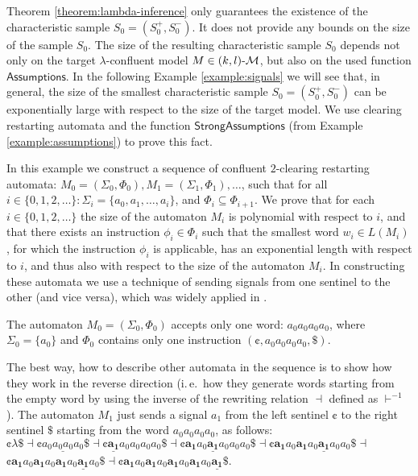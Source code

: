 Theorem \ref{theorem:lambda-inference} only guarantees the existence of the characteristic sample $S_0 = (S_0^+, S_0^-)$. It does not provide any bounds on the size of the sample $S_0$. The size of the resulting characteristic sample $S_0$ depends not only on the target $\lambda$-confluent model $M \in \textup{\sf $(k,l)$-\textup{\sf $\mathcal{M}$}}$, but also on the used function $\mathsf{Assumptions}$. In the following Example \ref{example:signals} we will see that, in general, the size of the smallest characteristic sample $S_0 = (S_0^+, S_0^-)$ can be exponentially large with respect to the size of the target model. We use clearing restarting automata and the function $\mathsf{StrongAssumptions}$ (from Example \ref{example:assumptions}) to prove this fact.

\begin{example}\label{example:signals}
In this example we construct a sequence of confluent $2$-clearing restarting automata: $M_0 = (\Sigma_0, \Phi_0), M_1 = (\Sigma_1, \Phi_1), \ldots$, such that for all $i \in \{0, 1, 2, \ldots\}: \Sigma_i = \{a_0, a_1, \ldots, a_i\}$, and $\Phi_i \subseteq \Phi_{i+1}$. We prove that for each $i \in \{0, 1, 2, \ldots\}$ the size of the automaton $M_i$ is polynomial with respect to $i$, and that there exists an instruction $\phi_i \in \Phi_i$ such that the smallest word $w_i \in L(M_i)$, for which the instruction $\phi_i$ is applicable, has an exponential  length with respect to $i$, and thus also with respect to the size of the automaton $M_i$. In constructing these automata we use a technique of sending signals from one  sentinel to the other (and vice versa), which was widely applied in \cite{CM10}.

The automaton $M_0 = (\Sigma_0, \Phi_0)$ accepts only one word: $a_0 a_0 a_0 a_0$, where $\Sigma_0 = \{ a_0 \}$ and $\Phi_0$ contains only one instruction $(\cent, a_0 a_0 a_0 a_0, \$)$.

The best way, how to describe other automata in the sequence is to show how they work in the reverse direction (i.\,e.\ how they generate words starting from the empty word by using the inverse of the rewriting relation $\dashv$ defined as $\vdash^{-1}$). The automaton $M_1$ just sends a signal $a_1$ from the left sentinel $\cent$ to the right sentinel $\$$ starting from the word $a_0 a_0 a_0 a_0$, as follows:
\\

\indent $\cent \lambda \$ \dashv \cent \underline{a_0 a_0 a_0 a_0} \$ \dashv 
\cent \underline{\mathbf{a_1}} a_0 a_0 a_0 a_0 \$ \dashv 
\cent \mathbf{a_1} a_0 \underline{\mathbf{a_1}} a_0 a_0 a_0 \$ \dashv
\cent \mathbf{a_1} a_0 \mathbf{a_1} a_0 \underline{\mathbf{a_1}} a_0 a_0 \$ \dashv $\\
\indent $\cent \mathbf{a_1} a_0 \mathbf{a_1} a_0 \mathbf{a_1} a_0 
\underline{\mathbf{a_1}} a_0 \$ \dashv 
\cent \mathbf{a_1} a_0 \mathbf{a_1} a_0 \mathbf{a_1} a_0 \mathbf{a_1} a_0 
\underline{\mathbf{a_1}} \$$.
\\


\end{example}
